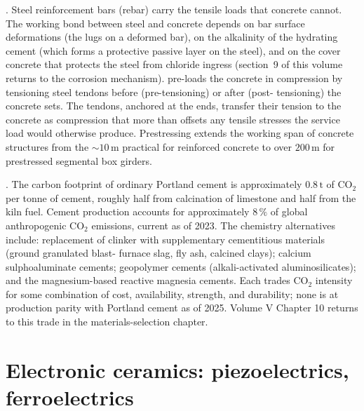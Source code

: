 . Steel reinforcement
bars (rebar) carry the tensile loads that concrete cannot. The
working bond between steel and concrete depends on bar surface
deformations (the lugs on a deformed bar), on the alkalinity of the
hydrating cement (which forms a protective passive layer on the steel),
and on the cover concrete that protects the steel from chloride
ingress (section~9 of this volume returns to the corrosion mechanism).
 pre-loads the concrete in compression by
tensioning steel tendons before (pre-tensioning) or after (post-
tensioning) the concrete sets. The tendons, anchored at the ends,
transfer their tension to the concrete as compression that more than
offsets any tensile stresses the service load would otherwise produce.
Prestressing extends the working span of concrete structures from the
$\sim 10\,\text{m}$ practical for reinforced concrete to over $200\,
\text{m}$ for prestressed segmental box girders.

. The carbon footprint of
ordinary Portland cement is approximately $0.8\,\text{t}$ of $\mathrm{CO_2}$
per tonne of cement, roughly half from calcination of limestone and
half from the kiln fuel. Cement production accounts for approximately
$8\,\%$ of global anthropogenic $\mathrm{CO_2}$ emissions, current as
of 2023. The chemistry alternatives include: replacement of clinker
with supplementary cementitious materials (ground granulated blast-
furnace slag, fly ash, calcined clays); calcium sulphoaluminate
cements; geopolymer cements (alkali-activated aluminosilicates); and
the magnesium-based reactive magnesia cements. Each trades
$\mathrm{CO_2}$ intensity for some combination of cost, availability,
strength, and durability; none is at production parity with Portland
cement as of 2025. Volume V Chapter 10 returns to this trade in the
materials-selection chapter.

\section{Electronic ceramics: piezoelectrics, ferroelectrics}

